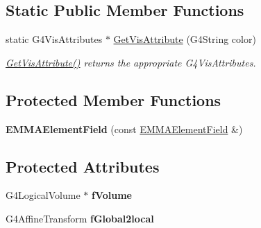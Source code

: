 \subsection*{Static Public Member Functions}
\begin{DoxyCompactItemize}
\item 
\hypertarget{classEMMAElementField_adcc4e33f5615dbf4266823277281bf79}{static G4\-Vis\-Attributes $\ast$ \hyperlink{classEMMAElementField_adcc4e33f5615dbf4266823277281bf79}{Get\-Vis\-Attribute} (G4\-String color)}\label{classEMMAElementField_adcc4e33f5615dbf4266823277281bf79}

\begin{DoxyCompactList}\small\item\em \hyperlink{classEMMAElementField_adcc4e33f5615dbf4266823277281bf79}{Get\-Vis\-Attribute()} returns the appropriate G4\-Vis\-Attributes. \end{DoxyCompactList}\end{DoxyCompactItemize}
\subsection*{Protected Member Functions}
\begin{DoxyCompactItemize}
\item 
\hypertarget{classEMMAElementField_a6b53a26e3a5e14a3d9eaec5b9c257c31}{{\bfseries E\-M\-M\-A\-Element\-Field} (const \hyperlink{classEMMAElementField}{E\-M\-M\-A\-Element\-Field} \&)}\label{classEMMAElementField_a6b53a26e3a5e14a3d9eaec5b9c257c31}

\end{DoxyCompactItemize}
\subsection*{Protected Attributes}
\begin{DoxyCompactItemize}
\item 
\hypertarget{classEMMAElementField_a629f5c6b312c421ead41e82ae2e4e4a0}{G4\-Logical\-Volume $\ast$ {\bfseries f\-Volume}}\label{classEMMAElementField_a629f5c6b312c421ead41e82ae2e4e4a0}

\item 
\hypertarget{classEMMAElementField_a7702673f0f70ababdfc04fe007ea9d51}{G4\-Affine\-Transform {\bfseries f\-Global2local}}\label{classEMMAElementField_a7702673f0f70ababdfc04fe007ea9d51}

\end{DoxyCompactItemize}



